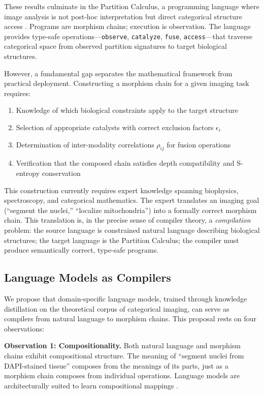 \documentclass[11pt,a4paper]{article}
\theoremstyle{definition}
\theoremstyle{remark}
\begin{document}
These results culminate in the Partition Calculus, a programming language where image analysis is not post-hoc interpretation but direct categorical structure access \cite{partition2024}. Programs are morphism chains; execution is observation. The language provides type-safe operations---\texttt{observe}, \texttt{catalyze}, \texttt{fuse}, \texttt{access}---that traverse categorical space from observed partition signatures to target biological structures.

However, a fundamental gap separates the mathematical framework from practical deployment. Constructing a morphism chain for a given imaging task requires:
\begin{enumerate}
    \item Knowledge of which biological constraints apply to the target structure
    \item Selection of appropriate catalysts with correct exclusion factors $\epsilon_i$
    \item Determination of inter-modality correlations $\rho_{ij}$ for fusion operations
    \item Verification that the composed chain satisfies depth compatibility and S-entropy conservation
\end{enumerate}

This construction currently requires expert knowledge spanning biophysics, spectroscopy, and categorical mathematics. The expert translates an imaging goal (``segment the nuclei,'' ``localize mitochondria'') into a formally correct morphism chain. This translation is, in the precise sense of compiler theory, a \emph{compilation} problem: the source language is constrained natural language describing biological structures; the target language is the Partition Calculus; the compiler must produce semantically correct, type-safe programs.

\subsection{Language Models as Compilers}

We propose that domain-specific language models, trained through knowledge distillation on the theoretical corpus of categorical imaging, can serve as compilers from natural language to morphism chains. This proposal rests on four observations:

\textbf{Observation 1: Compositionality.} Both natural language and morphism chains exhibit compositional structure. The meaning of ``segment nuclei from DAPI-stained tissue'' composes from the meanings of its parts, just as a morphism chain composes from individual operations. Language models are architecturally suited to learn compositional mappings \cite{Vaswani2017}.
\end{document}
